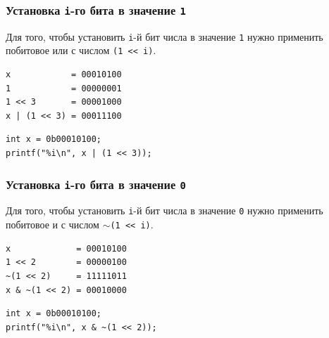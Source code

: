 \documentclass{article}
\begin{document}
\subsubsection*{Установка \texttt{i}-го бита в значение \texttt{1}}
Для того, чтобы установить \texttt{i}-й бит числа в значение \texttt{1} нужно применить побитовое или с числом \texttt{(1 <{}< i)}.

\begin{minipage}{0.35\textwidth}
\begin{lstlisting}
x            = 00010100
1            = 00000001
1 << 3       = 00001000
x | (1 << 3) = 00011100
\end{lstlisting}
\end{minipage}
\hfill
\begin{minipage}{0.55\textwidth}
\begin{lstlisting}
int x = 0b00010100;
printf("%i\n", x | (1 << 3));
\end{lstlisting}
\end{minipage}

\subsubsection*{Установка \texttt{i}-го бита в значение \texttt{0}}
Для того, чтобы установить \texttt{i}-й бит числа в значение \texttt{0} нужно применить побитовое и с числом \texttt{$\sim$(1 <{}< i)}.

\begin{minipage}{0.35\textwidth}
\begin{lstlisting}
x             = 00010100
1 << 2        = 00000100
~(1 << 2)     = 11111011
x & ~(1 << 2) = 00010000
\end{lstlisting}
\end{minipage}
\hfill
\begin{minipage}{0.55\textwidth}
\begin{lstlisting}
int x = 0b00010100;
printf("%i\n", x & ~(1 << 2));
\end{lstlisting}
\end{minipage}


\newpage
\end{document}
